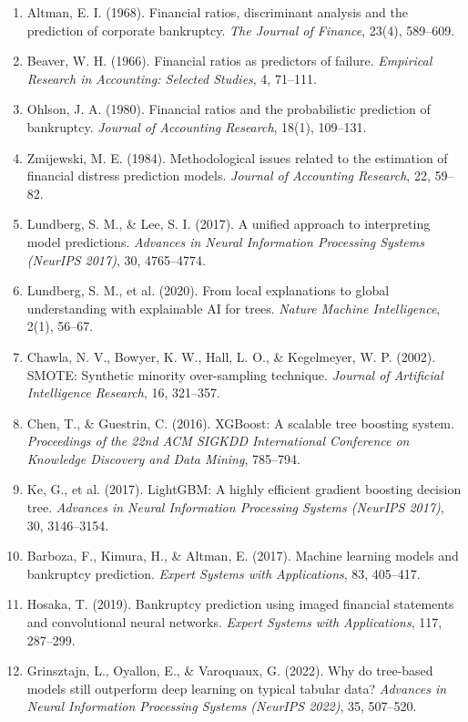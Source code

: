 \documentclass[11pt, a4paper]{article}
\begin{document}
\begin{enumerate}
    \item Altman, E. I. (1968). Financial ratios, discriminant analysis and the prediction of corporate bankruptcy. \textit{The Journal of Finance}, 23(4), 589--609.
    \item Beaver, W. H. (1966). Financial ratios as predictors of failure. \textit{Empirical Research in Accounting: Selected Studies}, 4, 71--111.
    \item Ohlson, J. A. (1980). Financial ratios and the probabilistic prediction of bankruptcy. \textit{Journal of Accounting Research}, 18(1), 109--131.
    \item Zmijewski, M. E. (1984). Methodological issues related to the estimation of financial distress prediction models. \textit{Journal of Accounting Research}, 22, 59--82.
    \item Lundberg, S. M., \& Lee, S. I. (2017). A unified approach to interpreting model predictions. \textit{Advances in Neural Information Processing Systems (NeurIPS 2017)}, 30, 4765--4774.
    \item Lundberg, S. M., et al. (2020). From local explanations to global understanding with explainable AI for trees. \textit{Nature Machine Intelligence}, 2(1), 56--67.
    \item Chawla, N. V., Bowyer, K. W., Hall, L. O., \& Kegelmeyer, W. P. (2002). SMOTE: Synthetic minority over-sampling technique. \textit{Journal of Artificial Intelligence Research}, 16, 321--357.
    \item Chen, T., \& Guestrin, C. (2016). XGBoost: A scalable tree boosting system. \textit{Proceedings of the 22nd ACM SIGKDD International Conference on Knowledge Discovery and Data Mining}, 785--794.
    \item Ke, G., et al. (2017). LightGBM: A highly efficient gradient boosting decision tree. \textit{Advances in Neural Information Processing Systems (NeurIPS 2017)}, 30, 3146--3154.
    \item Barboza, F., Kimura, H., \& Altman, E. (2017). Machine learning models and bankruptcy prediction. \textit{Expert Systems with Applications}, 83, 405--417.
    \item Hosaka, T. (2019). Bankruptcy prediction using imaged financial statements and convolutional neural networks. \textit{Expert Systems with Applications}, 117, 287--299.
    \item Grinsztajn, L., Oyallon, E., \& Varoquaux, G. (2022). Why do tree-based models still outperform deep learning on typical tabular data? \textit{Advances in Neural Information Processing Systems (NeurIPS 2022)}, 35, 507--520.
\end{enumerate}
\end{document}
